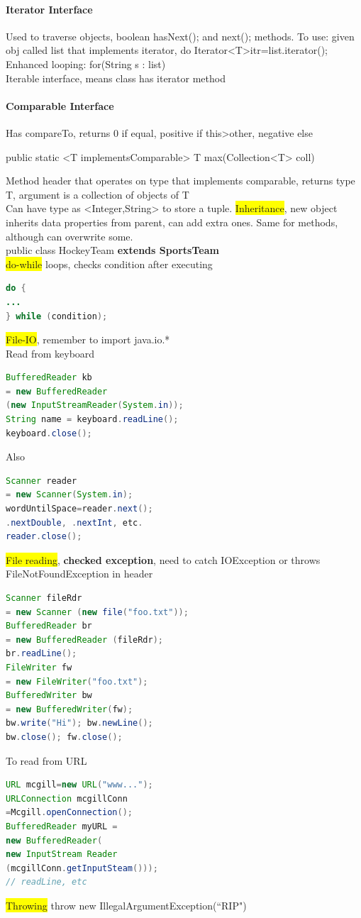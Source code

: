 \paragraph{Iterator Interface}Used to traverse objects, boolean hasNext(); and next(); methods. To use: given obj called list that implements iterator, do Iterator<T>itr=list.iterator(); \\ Enhanced looping: for(String s : list)
\\ Iterable interface, means class has iterator method
\vspace{-7 pt}
\paragraph{Comparable Interface} Has compareTo, returns 0 if equal, positive if this>other, negative else
\begin{algorithmic}
  \State public static <T implementsComparable> T max(Collection<T> coll){}
\end{algorithmic}
Method header that operates on type that implements comparable, returns type T, argument is a collection of objects of T
\\ Can have type as <Integer,String> to store a tuple.
\colorbox{Yellow}{Inheritance}, new object inherits data properties from parent, can add extra ones. Same for methods, although can overwrite some.
\\ public class HockeyTeam \textbf{extends SportsTeam}
\\ \colorbox{Yellow}{do-while} loops, checks condition after executing
\begin{lstlisting}[language=java]
do {
...
} while (condition);
\end{lstlisting}
\colorbox{Yellow}{File-IO}, remember to import java.io.*
\\ Read from keyboard
\begin{lstlisting}[language=java]
BufferedReader kb 
= new BufferedReader
(new InputStreamReader(System.in));
String name = keyboard.readLine();
keyboard.close();
\end{lstlisting}
Also
\begin{lstlisting}[language=java]
Scanner reader 
= new Scanner(System.in);
wordUntilSpace=reader.next();
.nextDouble, .nextInt, etc.
reader.close();
\end{lstlisting}
\colorbox{Yellow}{File reading}, \textbf{checked exception}, need to catch IOException or throws FileNotFoundException in header
\begin{lstlisting}[language=java]
Scanner fileRdr 
= new Scanner (new file("foo.txt"));
BufferedReader br 
= new BufferedReader (fileRdr);
br.readLine();
FileWriter fw 
= new FileWriter("foo.txt");
BufferedWriter bw 
= new BufferedWriter(fw);
bw.write("Hi"); bw.newLine();
bw.close(); fw.close();
\end{lstlisting}
To read from URL
\begin{lstlisting}[language=java]
URL mcgill=new URL("www...");
URLConnection mcgillConn
=Mcgill.openConnection();
BufferedReader myURL =
new BufferedReader(
new InputStream Reader
(mcgillConn.getInputSteam()));
// readLine, etc
\end{lstlisting}
\colorbox{Yellow}{Throwing} throw new IllegalArgumentException(``RIP")
\color{SeaGreen}
